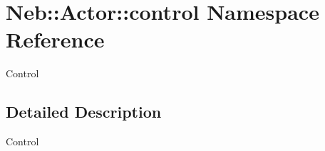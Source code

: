 \hypertarget{namespaceNeb_1_1Actor_1_1control}{\section{\-Neb\-:\-:\-Actor\-:\-:control \-Namespace \-Reference}
\label{namespaceNeb_1_1Actor_1_1control}
}


\-Control  




\subsection{\-Detailed \-Description}
\-Control 